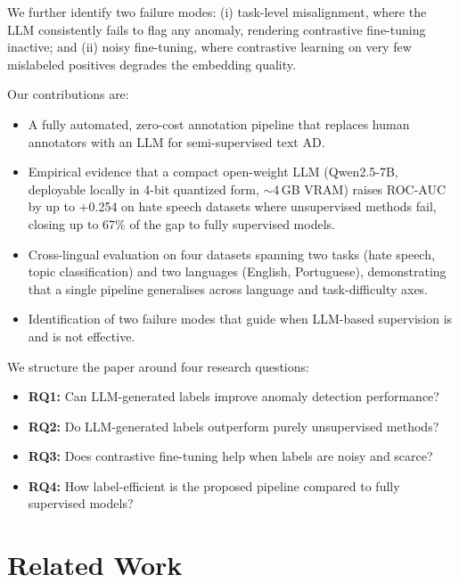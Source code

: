 \documentclass[12pt]{article}
\begin{document}
We further identify two failure modes: (i) task-level misalignment, where the LLM consistently fails to flag any anomaly, 
rendering contrastive fine-tuning inactive; and (ii) noisy fine-tuning, where contrastive learning 
on very few mislabeled positives degrades the embedding quality.


Our contributions are:
\begin{itemize}
    \item A fully automated, zero-cost annotation pipeline that 
          replaces human annotators with an LLM for semi-supervised text AD.
    \item Empirical evidence that a compact open-weight LLM (Qwen2.5-7B,
          deployable locally in 4-bit quantized form, $\sim$4\,GB VRAM)
          raises ROC-AUC by up to $+$0.254 on hate speech datasets where
          unsupervised methods fail, closing up to 67\% of the gap
          to fully supervised models.
    \item Cross-lingual evaluation on four datasets spanning two tasks
          (hate speech, topic classification) and two languages (English, Portuguese),
          demonstrating that a single pipeline generalises
          across language and task-difficulty axes.
    \item Identification of two failure modes that guide when LLM-based 
          supervision is and is not effective.
\end{itemize}

We structure the paper around four research questions:

\begin{itemize}
    \item \textbf{RQ1:} Can LLM-generated labels improve anomaly detection performance?
    \item \textbf{RQ2:} Do LLM-generated labels outperform purely unsupervised methods?
    \item \textbf{RQ3:} Does contrastive fine-tuning help when labels are noisy and scarce?
    \item \textbf{RQ4:} How label-efficient is the proposed pipeline compared to fully supervised models?
\end{itemize}

\section{Related Work}
\end{document}
